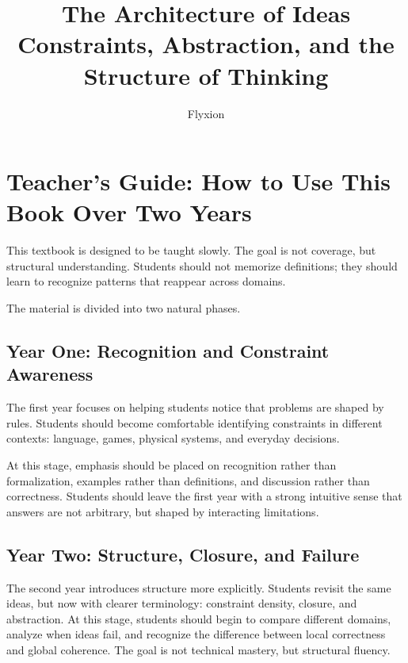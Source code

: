 \documentclass[11pt]{book}
\title{\textbf{The Architecture of Ideas}\\[6pt]
\large Constraints, Abstraction, and the Structure of Thinking}
\author{Flyxion}
\date{}
\theoremstyle{definition}
\theoremstyle{remark}
\begin{document}

\maketitle
\tableofcontents

\chapter*{Teacher's Guide: How to Use This Book Over Two Years}

This textbook is designed to be taught slowly. The goal is not coverage,
but structural understanding. Students should not memorize definitions;
they should learn to recognize patterns that reappear across domains.

The material is divided into two natural phases.

\section*{Year One: Recognition and Constraint Awareness}

The first year focuses on helping students notice that problems are shaped
by rules. Students should become comfortable identifying constraints in
different contexts: language, games, physical systems, and everyday decisions.

At this stage, emphasis should be placed on recognition rather than
formalization, examples rather than definitions, and discussion rather
than correctness. Students should leave the first year with a strong
intuitive sense that answers are not arbitrary, but shaped by interacting
limitations.

\section*{Year Two: Structure, Closure, and Failure}

The second year introduces structure more explicitly. Students revisit the
same ideas, but now with clearer terminology: constraint density, closure,
and abstraction. At this stage, students should begin to compare different
domains, analyze when ideas fail, and recognize the difference between
local correctness and global coherence. The goal is not technical mastery,
but structural fluency.
\end{document}
